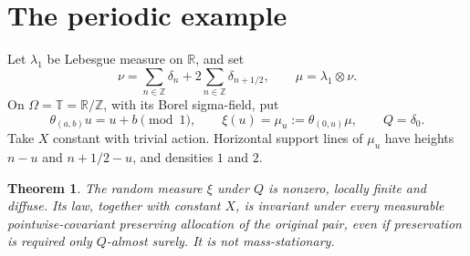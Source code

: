 \documentclass[11pt]{article}
\newtheorem{theorem}{Theorem}
\newcommand{\R}{\mathbb R}
\newcommand{\Z}{\mathbb Z}
\newcommand{\T}{\mathbb T}
\begin{document}
\section{The periodic example}

Let $\lambda_1$ be Lebesgue measure on $\R$, and set
\begin{equation}\label{measure}
 \nu=\sum_{n\in\Z}\delta_n+2\sum_{n\in\Z}\delta_{n+1/2},
 \qquad \mu=\lambda_1\otimes\nu.
\end{equation}
On $\Omega=\T=\R/\Z$, with its Borel sigma-field, put
\[
 \theta_{(a,b)}u=u+b\pmod1,\qquad
 \xi(u)=\mu_u:=\theta_{(0,u)}\mu,\qquad Q=\delta_0.
\]
Take $X$ constant with trivial action. Horizontal support lines of $\mu_u$ have heights $n-u$ and $n+1/2-u$, and densities $1$ and $2$.

\begin{theorem}\label{counterexample}
The random measure $\xi$ under $Q$ is nonzero, locally finite and diffuse. Its law, together with constant $X$, is invariant under every measurable pointwise-covariant preserving allocation of the original pair, even if preservation is required only $Q$-almost surely. It is not mass-stationary.
\end{theorem}
\end{document}

